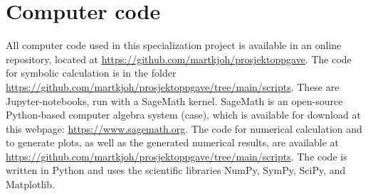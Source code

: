 \chapter{Computer code}
\label{appendix:computer code}

All computer code used in this specialization project is available in an online repository, located at \url{https://github.com/martkjoh/prosjektoppgave}.
The code for symbolic calculation is in the folder \url{https://github.com/martkjoh/prosjektoppgave/tree/main/scripts}. These are Jupyter-notebooks, run with a SageMath kernel.
SageMath is an open-source Python-based computer algebra system (case), which is available for download at this webpage: \url{https://www.sagemath.org}.
The code for numerical calculation and to generate plots, as well as the generated numerical results, are available at \url{https://github.com/martkjoh/prosjektoppgave/tree/main/scripts}.
The code is written in Python and uses the scientific libraries NumPy, SymPy, SciPy, and Matplotlib.


